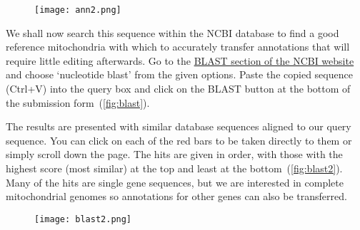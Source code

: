 \documentclass[11pt]{article}
\begin{document}
\begin{figure}[H]
  \centering
    \texttt{[image: ann2.png]}
  \label{fig:ann2}
\end{figure}

We shall now search this sequence within the NCBI database to find a good reference mitochondria with which to accurately transfer annotations that will require little editing afterwards. Go to the \href{http://blast.ncbi.nlm.nih.gov/Blast.cgi}{BLAST section of the NCBI website} and choose `nucleotide blast' from the given options. Paste the copied sequence (Ctrl+V) into the query box and click on the BLAST button at the bottom of the submission form~(\autoref{fig:blast}). 

\begin{figure}[H]
  \label{fig:blast}
\end{figure}

The results are presented with similar database sequences aligned to our query sequence. You can click on each of the red bars to be taken directly to them or simply scroll down the page. The hits are given in order, with those with the highest score (most similar) at the top and least at the bottom~(\autoref{fig:blast2}). Many of the hits are single gene sequences, but we are interested in complete mitochondrial genomes so annotations for other genes can also be transferred.

\begin{figure}[H]
  \centering
    \texttt{[image: blast2.png]}
  \label{fig:blast2}
\end{figure}
\end{document}
